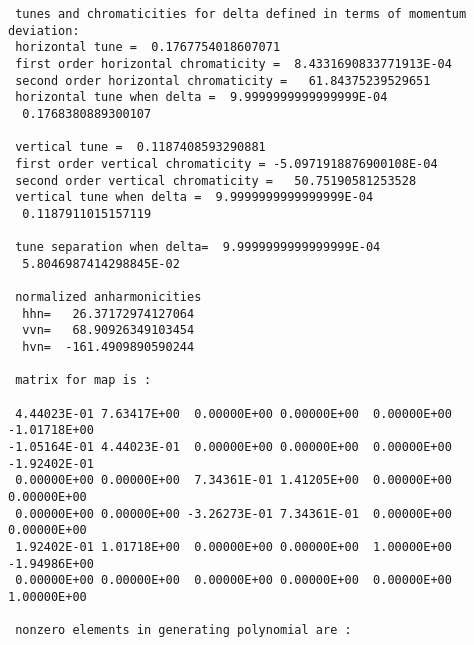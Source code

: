 {\begin{verbatim}
 tunes and chromaticities for delta defined in terms of momentum deviation:
 horizontal tune =  0.1767754018607071
 first order horizontal chromaticity =  8.4331690833771913E-04
 second order horizontal chromaticity =   61.84375239529651
 horizontal tune when delta =  9.9999999999999999E-04
  0.1768380889300107

 vertical tune =  0.1187408593290881
 first order vertical chromaticity = -5.0971918876900108E-04
 second order vertical chromaticity =   50.75190581253528
 vertical tune when delta =  9.9999999999999999E-04
  0.1187911015157119

 tune separation when delta=  9.9999999999999999E-04
  5.8046987414298845E-02

 normalized anharmonicities
  hhn=   26.37172974127064
  vvn=   68.90926349103454
  hvn=  -161.4909890590244

 matrix for map is :

 4.44023E-01 7.63417E+00  0.00000E+00 0.00000E+00  0.00000E+00 -1.01718E+00
-1.05164E-01 4.44023E-01  0.00000E+00 0.00000E+00  0.00000E+00 -1.92402E-01
 0.00000E+00 0.00000E+00  7.34361E-01 1.41205E+00  0.00000E+00  0.00000E+00
 0.00000E+00 0.00000E+00 -3.26273E-01 7.34361E-01  0.00000E+00  0.00000E+00
 1.92402E-01 1.01718E+00  0.00000E+00 0.00000E+00  1.00000E+00 -1.94986E+00
 0.00000E+00 0.00000E+00  0.00000E+00 0.00000E+00  0.00000E+00  1.00000E+00

 nonzero elements in generating polynomial are :


\end{verbatim}}
